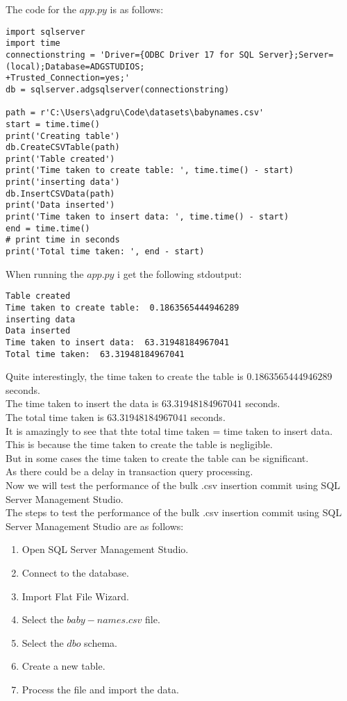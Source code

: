 The code for the $app.py$ is as follows: \\
\begin{verbatim}
import sqlserver
import time
connectionstring = 'Driver={ODBC Driver 17 for SQL Server};Server=(local);Database=ADGSTUDIOS;
+Trusted_Connection=yes;'
db = sqlserver.adgsqlserver(connectionstring)

path = r'C:\Users\adgru\Code\datasets\babynames.csv'
start = time.time()
print('Creating table')
db.CreateCSVTable(path)
print('Table created')
print('Time taken to create table: ', time.time() - start)
print('inserting data')
db.InsertCSVData(path)
print('Data inserted')
print('Time taken to insert data: ', time.time() - start)
end = time.time()
# print time in seconds
print('Total time taken: ', end - start)
\end{verbatim}

When running the $app.py$ i get the following stdoutput: \\
\begin{verbatim}
Table created
Time taken to create table:  0.1863565444946289
inserting data
Data inserted
Time taken to insert data:  63.31948184967041
Total time taken:  63.31948184967041
\end{verbatim}

Quite interestingly, the time taken to create the table is $0.1863565444946289$ seconds. \\
The time taken to insert the data is $63.31948184967041$ seconds. \\
The total time taken is $63.31948184967041$ seconds. \\

It is amazingly to see that thte total time taken = time taken to insert data. \\
This is because the time taken to create the table is negligible. \\
But in some cases the time taken to create the table can be significant. \\
As there could be a delay in transaction query processing. \\

Now we will test the performance of the bulk .csv insertion commit using SQL Server Management Studio. \\

The steps to test the performance of the bulk .csv insertion commit using SQL Server Management Studio are as follows: \\
\begin{enumerate}
\item Open SQL Server Management Studio.
\item Connect to the database.
\item Import Flat File Wizard.
\item Select the $baby-names.csv$ file.
\item Select the $dbo$ schema.
\item Create a new table.
\item Process the file and import the data.
\end{enumerate}

